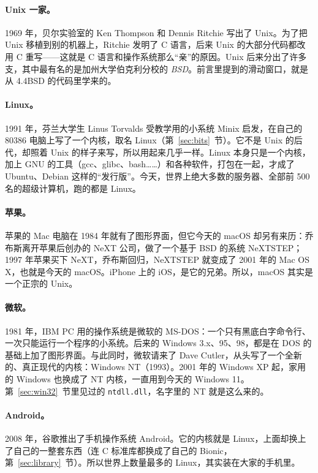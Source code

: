 \paragraph{Unix 一家。}
1969 年，贝尔实验室的 Ken Thompson 和 Dennis Ritchie 写出了 Unix。为了把 Unix 移植到别的机器上，Ritchie 发明了 C 语言，后来 Unix 的大部分代码都改用 C 重写——这就是 C 语言和操作系统那么“亲”的原因。Unix 后来分出了许多支，其中最有名的是加州大学伯克利分校的 \emph{BSD}。前言里提到的滑动窗口，就是从 4.4BSD 的代码里学来的。

\paragraph{Linux。}
1991 年，芬兰大学生 Linus Torvalds 受教学用的小系统 Minix 启发，在自己的 80386 电脑上写了一个内核，取名 Linux（第~\ref{sec:bits}~节）。它不是 Unix 的后代，却照着 Unix 的样子来写，所以用起来几乎一样。Linux 本身只是一个内核，加上 GNU 的工具（gcc、glibc、bash……）和各种软件，打包在一起，才成了 Ubuntu、Debian 这样的“发行版”。今天，世界上绝大多数的服务器、全部前 500 名的超级计算机，跑的都是 Linux。

\paragraph{苹果。}
苹果的 Mac 电脑在 1984 年就有了图形界面，但它今天的 macOS 却另有来历：乔布斯离开苹果后创办的 NeXT 公司，做了一个基于 BSD 的系统 NeXTSTEP；1997 年苹果买下 NeXT，乔布斯回归，NeXTSTEP 就变成了 2001 年的 Mac OS X，也就是今天的 macOS。iPhone 上的 iOS，是它的兄弟。所以，macOS 其实是一个正宗的 Unix。

\paragraph{微软。}
1981 年，IBM PC 用的操作系统是微软的 MS-DOS：一个只有黑底白字命令行、一次只能运行一个程序的小系统。后来的 Windows 3.x、95、98，都是在 DOS 的基础上加了图形界面。与此同时，微软请来了 Dave Cutler，从头写了一个全新的、真正现代的内核：Windows NT（1993）。2001 年的 Windows XP 起，家用的 Windows 也换成了 NT 内核，一直用到今天的 Windows 11。第~\ref{sec:win32}~节里见过的 \texttt{ntdll.dll}，名字里的 NT 就是这么来的。

\paragraph{Android。}
2008 年，谷歌推出了手机操作系统 Android。它的内核就是 Linux，上面却换上了自己的一整套东西（连 C 标准库都换成了自己的 Bionic，第~\ref{sec:library}~节）。所以世界上数量最多的 Linux，其实装在大家的手机里。

